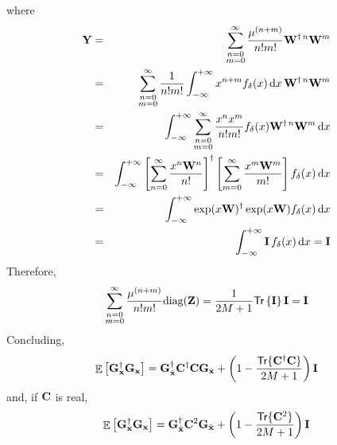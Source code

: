 \documentclass[final, a4paper]{IEEEtran}
\newcommand{\xv}{{\bf x}}
\newcommand{\Cm}{{\bf C}}
\newcommand{\Gm}{{\bf G}}
\newcommand{\Id}{{\bf I}}
\newcommand{\Wm}{{\bf W}}
\newcommand{\Ym}{{\bf Y}}
\newcommand{\Zm}{{\bf Z}}
\def\xvh{{\hat{\xv}}}
\newcommand{\diag}{{\hbox{diag}}}
\def\trace{\mathsf{Tr}}
\def\non{\nonumber\\}
\begin{document}
where
\begin{eqnarray*}
\Ym &=&\sum_{\substack{n=0 \\ m=0}}^\infty \frac{\mu^{(n+m)}}{n!m!}\Wm^{\dagger\,n}\Wm^m \non
&=&\sum_{\substack{n=0 \\ m=0}}^\infty \frac{1}{n!m!} \int_{-\infty}^{+\infty} x^{n+m} f_\delta(x) \dd x\, \Wm^{\dagger\,n}\Wm^m\non
&=&\int_{-\infty}^{+\infty}\sum_{\substack{n=0 \\ m=0}}^\infty \frac{x^n x^m}{n!m!} f_\delta(x) \Wm^{\dagger\,n}\Wm^m  \dd x \non
&=&\int_{-\infty}^{+\infty}\left[ \sum_{n=0}^\infty\frac{x^n \Wm^n}{n!}\right]\Herm\left[\sum_{m=0}^\infty \frac{x^m\Wm^m}{m!}\right] f_\delta(x)\dd x \non
&=&\int_{-\infty}^{+\infty}\exp(x\Wm)\Herm \exp(x\Wm) f_\delta(x)\dd x  \non
&=&\int_{-\infty}^{+\infty} \Id\,f_\delta(x)\dd x
= \Id
\end{eqnarray*}
Therefore,
\[ \sum_{\substack{n=0 \\ m=0}}^\infty \frac{\mu^{(n+m)}}{n!m!}\diag(\Zm) = \frac{1}{2M+1}\trace\left\{\Id\right\} \Id = \Id \]
Concluding,
\[ \EE\left[\Gm_\xv\Herm\Gm_\xv\right]  = \Gm_\xvh\Herm\Cm\Herm\Cm\Gm_\xvh + \left( 1-\frac{\trace\{\Cm\Herm\Cm\}}{2M+1}\right)\Id \]
and, if $\Cm$ is real,
\[ \EE\left[\Gm_\xv\Herm\Gm_\xv\right]  = \Gm_\xvh\Herm \Cm^2 \Gm_\xvh + \left(1-\frac{\trace\{\Cm^2\}}{2M+1}\right)\Id \]
\end{document}
